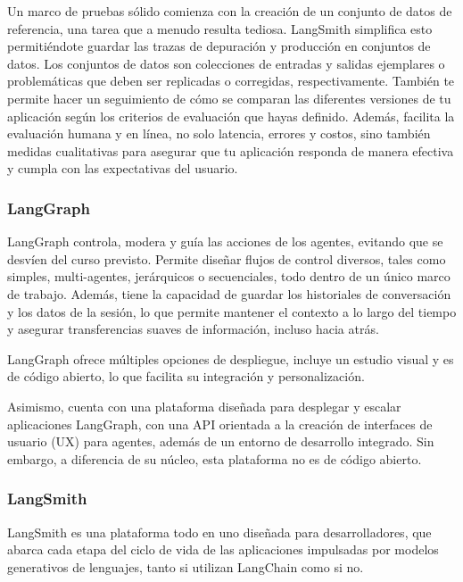 Un marco de pruebas sólido comienza con la creación de un conjunto de datos de referencia, una tarea que a menudo resulta tediosa. LangSmith simplifica esto permitiéndote guardar las trazas de depuración y producción en conjuntos de datos. Los conjuntos de datos son colecciones de entradas y salidas ejemplares o problemáticas que deben ser replicadas o corregidas, respectivamente. También te permite hacer un seguimiento de cómo se comparan las diferentes versiones de tu aplicación según los criterios de evaluación que hayas definido. Además, facilita la evaluación humana y en línea, no solo latencia, errores y costos, sino también medidas cualitativas para asegurar que tu aplicación responda de manera efectiva y cumpla con las expectativas del usuario. \cite{PaginaLangChainOficialEvaluacion} \cite{mavroudis2024langchain}


 
\subsubsection{LangGraph}

LangGraph controla, modera y guía las acciones de los agentes, evitando que se desvíen del curso previsto. Permite diseñar flujos de control diversos, tales como simples, multi-agentes, jerárquicos o secuenciales, todo dentro de un único marco de trabajo. Además, tiene la capacidad de guardar los historiales de conversación y los datos de la sesión, lo que permite mantener el contexto a lo largo del tiempo y asegurar transferencias suaves de información, incluso hacia atrás.

LangGraph ofrece múltiples opciones de despliegue, incluye un estudio visual y es de código abierto, lo que facilita su integración y personalización.

Asimismo, cuenta con una plataforma diseñada para desplegar y escalar aplicaciones LangGraph, con una API orientada a la creación de interfaces de usuario (UX) para agentes, además de un entorno de desarrollo integrado. Sin embargo, a diferencia de su núcleo, esta plataforma no es de código abierto.\cite{PaginaLangChainOficialLangGraph} \cite{mavroudis2024langchain}


 

\subsubsection{LangSmith}

LangSmith es una plataforma todo en uno diseñada para desarrolladores, que abarca cada etapa del ciclo de vida de las aplicaciones impulsadas por modelos generativos de lenguajes, tanto si utilizan LangChain como si no.

